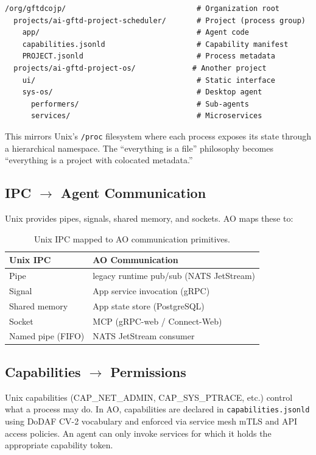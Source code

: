 \documentclass[11pt,a4paper]{article}
\begin{document}
\begin{verbatim}
/org/gftdcojp/                              # Organization root
  projects/ai-gftd-project-scheduler/       # Project (process group)
    app/                                    # Agent code
    capabilities.jsonld                     # Capability manifest
    PROJECT.jsonld                          # Process metadata
  projects/ai-gftd-project-os/             # Another project
    ui/                                     # Static interface
    sys-os/                                 # Desktop agent
      performers/                           # Sub-agents
      services/                             # Microservices
\end{verbatim}

This mirrors Unix's \texttt{/proc} filesystem where each process exposes its
state through a hierarchical namespace. The ``everything is a file''
philosophy becomes ``everything is a project with colocated metadata.''

\subsection{IPC $\rightarrow$ Agent Communication}

Unix provides pipes, signals, shared memory, and sockets. AO maps these to:

\begin{table}[h]
\centering
\begin{tabular}{@{}ll@{}}
\toprule
\textbf{Unix IPC} & \textbf{AO Communication} \\
\midrule
Pipe & legacy runtime pub/sub (NATS JetStream) \\
Signal & App service invocation (gRPC) \\
Shared memory & App state store (PostgreSQL) \\
Socket & MCP (gRPC-web / Connect-Web) \\
Named pipe (FIFO) & NATS JetStream consumer \\
\bottomrule
\end{tabular}
\caption{Unix IPC mapped to AO communication primitives.}
\end{table}

\subsection{Capabilities $\rightarrow$ Permissions}

Unix capabilities (CAP\_NET\_ADMIN, CAP\_SYS\_PTRACE, etc.) control what a
process may do. In AO, capabilities are declared in \texttt{capabilities.jsonld}
using DoDAF CV-2 vocabulary and enforced via service mesh mTLS and API access policies.
An agent can only invoke services for which it holds the appropriate capability
token.
\end{document}
